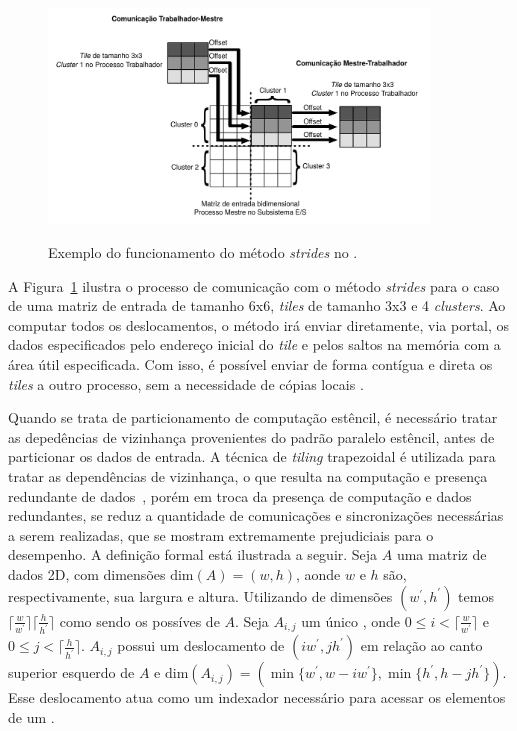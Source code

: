 \begin{figure}[t]
	\centering
    \caption{Exemplo do funcionamento do método \textit{strides} no \mppa.}
	\includegraphics[width=0.9\textwidth]{figs/stridesImage.pdf} \\
	\label{fig:strides}
\end{figure}


A Figura~\ref{fig:strides} ilustra o processo de comunicação com o método \textit{strides} para o caso de uma matriz de entrada de tamanho 6x6, \textit{tiles} de tamanho 3x3 e 4 \textit{clusters}. Ao computar todos os deslocamentos, o método irá enviar diretamente, via portal, os dados especificados pelo endereço inicial do \textit{tile} e pelos saltos na memória com a área útil especificada. Com isso, é possível enviar de forma contígua e direta os \textit{tiles} a outro processo, sem a necessidade de cópias locais \cite{Podesta:TCC}.

Quando se trata de particionamento de computação estêncil, é necessário tratar as depedências de vizinhança provenientes do padrão paralelo estêncil, antes de particionar os dados de entrada. A técnica de \textit{tiling} trapezoidal é utilizada para tratar as dependências de vizinhança, o que resulta na computação e presença redundante de dados~\cite{Rocha:2017}, porém em troca da presença de computação e dados redundantes, se reduz a quantidade de comunicações e sincronizações necessárias a serem realizadas, que se mostram extremamente prejudiciais para o desempenho. A definição formal está ilustrada a seguir.
Seja $A$ uma matriz de dados 2D, com dimensões $\textrm{dim}(A) = (w, h)$, aonde $w$ e $h$ são, respectivamente, sua largura e altura.
Utilizando \tiles de dimensões $(w^\prime, h^\prime)$ temos $\lceil\frac{w}{w^\prime}\rceil\lceil\frac{h}{h^\prime}\rceil$ como sendo os possíves \tiles de $A$.
Seja $A_{i,j}$ um único \tile, onde $0\leq i < \lceil\frac{w}{ w^\prime}\rceil$ e $0\leq j < \lceil\frac{h}{ h^\prime}\rceil$.
$A_{i,j}$ possui um deslocamento de $(i w^\prime,j h^\prime)$ em relação ao canto superior esquerdo de $A$ e $\textrm{dim}(A_{i,j}) = (\min\{w^\prime, w-i w^\prime\}, \min\{h^\prime, h-j h^\prime\})$.
Esse deslocamento atua como um indexador necessário para acessar os elementos de um \tile.

